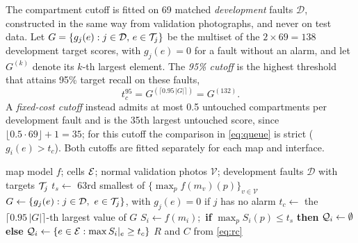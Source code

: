 \documentclass[10pt,twocolumn,letterpaper]{article}
\begin{document}
The compartment cutoff is fitted on 69 matched \emph{development} faults $\mathcal{D}$, constructed in the same way from validation photographs, and never on test data. Let $G=\{g_j(e): j\in\mathcal{D},\,e\in\mathcal{T}_j\}$ be the multiset of the $2\times69=138$ development target scores, with $g_j(e)=0$ for a fault without an alarm, and let $G^{(k)}$ denote its $k$-th largest element. The \emph{95\% cutoff} is the highest threshold that attains 95\% target recall on these faults,
\begin{equation}
 t_c^{95}=G^{(\lceil 0.95\,|G|\rceil)}=G^{(132)}.
 \label{eq:tc}
\end{equation} A \emph{fixed-cost cutoff} instead admits at most 0.5 untouched compartments per development fault and is the 35th largest untouched score, since $\lfloor0.5\cdot69\rfloor+1=35$; for this cutoff the comparison in \cref{eq:queue} is strict ($g_i(e)>t_c$). Both cutoffs are fitted separately for each map and interface.


\begin{algorithm}[t]
\caption{Calibrated inspection queue}
\label{alg:queue}
\begin{algorithmic}[1]
\Require map model $f$; cells $\mathcal{E}$; normal validation photos $\mathcal{V}$; development faults $\mathcal{D}$ with targets $\mathcal{T}_j$
\State $t_s\gets$ 63rd smallest of $\{\max_p f(m_v)(p)\}_{v\in\mathcal{V}}$ 
\State $G\gets\{g_j(e): j\in\mathcal{D},\ e\in\T_j\}$, with $g_j(e)=0$ if $j$ has no alarm
\State $t_c\gets$ the $\lceil 0.95\,|G|\rceil$-th largest value of $G$ 
  \State $S_i\gets f(m_i)$;\ \textbf{if} $\max_p S_i(p)\le t_s$ \textbf{then} $\mathcal{Q}_i\gets\emptyset$
  \State \textbf{else} $\mathcal{Q}_i\gets\{e\in\mathcal{E}: \max S_i|_e\ge t_c\}$
\EndFor
\State \Return $R$ and $C$ from \cref{eq:rc}
\end{algorithmic}
\end{algorithm}
\end{document}
